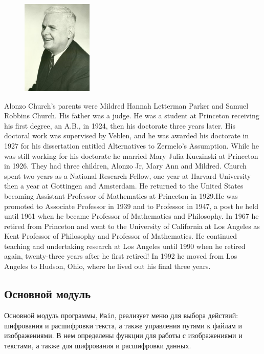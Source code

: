\documentclass[10pt,a4paper,final]{article} %
\begin{document}
\begin{figure} %
	\centering
	\includegraphics[width=0.3\textwidth]{img/Alonzo_Church} %
	
\end{figure}

Alonzo Church's parents were Mildred Hannah Letterman Parker and Samuel Robbins Church. His father was a judge. He was a student at Princeton receiving his first degree, an A.B., in 1924, then his doctorate three years later. His doctoral work was supervised by Veblen, and he was awarded his doctorate in 1927 for his dissertation entitled Alternatives to Zermelo's Assumption. While he was still working for his doctorate he married Mary Julia Kuczinski at Princeton in 1926. They had three children, Alonzo Jr, Mary Ann and Mildred. Church spent two years as a National Research Fellow, one year at Harvard University then a year at Gottingen and Amsterdam. He returned to the United States becoming Assistant Professor of Mathematics at Princeton in 1929.He was promoted to Associate Professor in 1939 and to Professor in 1947, a post he held until 1961 when he became Professor of Mathematics and Philosophy. In 1967 he retired from Princeton and went to the University of California at Los Angeles as Kent Professor of Philosophy and Professor of Mathematics. He continued teaching and undertaking research at Los Angeles until 1990 when he retired again, twenty-three years after he first retired! In 1992 he moved from Los Angeles to Hudson, Ohio, where he lived out his final three years.\\



\subsection{Основной модуль}

Основной модуль программы, \texttt{Main}, реализует меню для выбора действий: шифрования и расшифровки текста, а также управления путями к файлам и изображениями. В нем определены функции для работы с изображениями и текстами, а также для шифрования и расшифровки данных.
\end{document}
